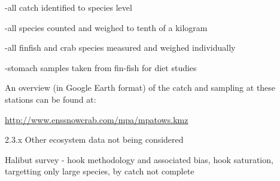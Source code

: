 \documentclass[letterpaper,portrait,12pt]{scrartcl}
\numberwithin{equation}{section}		%
\numberwithin{figure}{section}			%
\numberwithin{table}{section}				%
\begin{document}
-all catch identified to species level




-all species counted and weighed to tenth of a kilogram




-all finfish and crab species measured and weighed individually




-stomach samples taken from fin-fish for diet studies




 




An overview (in Google Earth format) of the catch and sampling at these stations can be found at:




\href{http://www.enssnowcrab.com/mpa/mpatows.kmz}{\textcolor[rgb]{0.000,0.082,0.361}{\uline{http}}}\href{http://www.enssnowcrab.com/mpa/mpatows.kmz}{\textcolor[rgb]{0.000,0.082,0.361}{\uline{://}}}\href{http://www.enssnowcrab.com/mpa/mpatows.kmz}{\textcolor[rgb]{0.000,0.082,0.361}{\uline{www}}}\href{http://www.enssnowcrab.com/mpa/mpatows.kmz}{\textcolor[rgb]{0.000,0.082,0.361}{\uline{.}}}\href{http://www.enssnowcrab.com/mpa/mpatows.kmz}{\textcolor[rgb]{0.000,0.082,0.361}{\uline{enssnowcrab}}}\href{http://www.enssnowcrab.com/mpa/mpatows.kmz}{\textcolor[rgb]{0.000,0.082,0.361}{\uline{.}}}\href{http://www.enssnowcrab.com/mpa/mpatows.kmz}{\textcolor[rgb]{0.000,0.082,0.361}{\uline{com}}}\href{http://www.enssnowcrab.com/mpa/mpatows.kmz}{\textcolor[rgb]{0.000,0.082,0.361}{\uline{/}}}\href{http://www.enssnowcrab.com/mpa/mpatows.kmz}{\textcolor[rgb]{0.000,0.082,0.361}{\uline{mpa}}}\href{http://www.enssnowcrab.com/mpa/mpatows.kmz}{\textcolor[rgb]{0.000,0.082,0.361}{\uline{/}}}\href{http://www.enssnowcrab.com/mpa/mpatows.kmz}{\textcolor[rgb]{0.000,0.082,0.361}{\uline{mpatows}}}\href{http://www.enssnowcrab.com/mpa/mpatows.kmz}{\textcolor[rgb]{0.000,0.082,0.361}{\uline{.}}}\href{http://www.enssnowcrab.com/mpa/mpatows.kmz}{\textcolor[rgb]{0.000,0.082,0.361}{\uline{kmz}}}









2.3.x Other ecosystem data not being considered



\begin{flushleft}

	Halibut survey - hook methodology and associated bias, hook saturation, targetting only large species, by catch not complete 

\end{flushleft}
\end{document}
